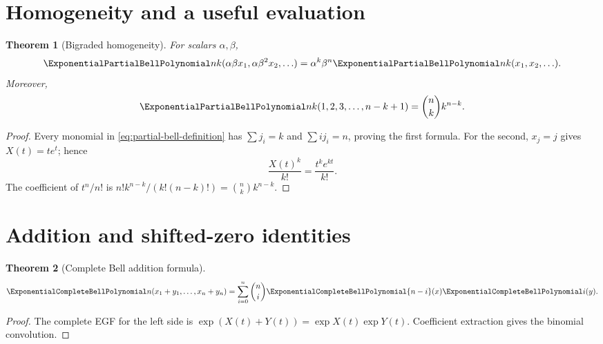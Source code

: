 \documentclass[11pt,a4paper,oneside,openany]{book}
\newtheorem{theorem}{Theorem}[chapter]
\theoremstyle{definition}
\theoremstyle{remark}
\begin{document}
\section{Homogeneity and a useful evaluation}
\begin{theorem}[Bigraded homogeneity]\label{thm:bell-bihomogeneous}
For scalars $\alpha,\beta$,
\begin{equation}\label{eq:bell-bihomogeneous}
 \ExponentialPartialBellPolynomial nk(\alpha\beta x_1,\alpha\beta^2x_2,\ldots)
 =\alpha^k\beta^n\ExponentialPartialBellPolynomial nk(x_1,x_2,\ldots).
\end{equation}
Moreover,
\begin{equation}\label{eq:bell-linear-arguments}
 \ExponentialPartialBellPolynomial nk(1,2,3,\ldots,n-k+1)=\binom nk k^{n-k}.
\end{equation}
\end{theorem}
\begin{proof}
Every monomial in \eqref{eq:partial-bell-definition} has
$\sum j_i=k$ and $\sum ij_i=n$, proving the first formula.  For the second,
$x_j=j$ gives $X(t)=te^t$; hence
\[
 \frac{X(t)^k}{k!}=\frac{t^ke^{kt}}{k!}.
\]
The coefficient of $t^n/n!$ is
$n!k^{n-k}/(k!(n-k)!)=\binom nk k^{n-k}$.
\end{proof}

\section{Addition and shifted-zero identities}
\begin{theorem}[Complete Bell addition formula]\label{thm:complete-bell-addition}
\begin{equation}\label{eq:complete-bell-addition}
 \ExponentialCompleteBellPolynomial n(x_1+y_1,\ldots,x_n+y_n)
 =\sum_{i=0}^{n}\binom ni\ExponentialCompleteBellPolynomial{n-i}(x)\ExponentialCompleteBellPolynomial i(y).
\end{equation}
\end{theorem}
\begin{proof}
The complete EGF for the left side is
$\exp(X(t)+Y(t))=\exp X(t)\exp Y(t)$.  Coefficient extraction gives the binomial
convolution.
\end{proof}
\end{document}

